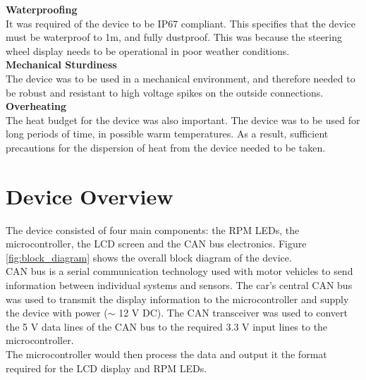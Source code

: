 \documentclass[a4paper,12pt]{article}
\begin{document}
\textbf{Waterproofing} \\

It was required of the device to be IP67 compliant. This specifies that the device must be waterproof to 1m, and fully dustproof. This was because the steering wheel display needs to be operational in poor weather conditions. \\

\textbf{Mechanical Sturdiness} \\

The device was to be used in a mechanical environment, and therefore needed to be robust and resistant to high voltage spikes on the outside connections. \\

\textbf{Overheating} \\

The heat budget for the device was also important. The device was to be used for long periods of time, in possible warm temperatures. As a result, sufficient precautions for the dispersion of heat from the device needed to be taken.


\newpage
\section{Device Overview}
\label{sec:device_overview}

The device consisted of four main components: the RPM LEDs, the microcontroller, the LCD screen and the CAN bus electronics. Figure \ref{fig:block_diagram} shows the overall block diagram of the device. \\



CAN bus is a serial communication technology used with motor vehicles to send information between individual systems and sensors. The car's central CAN bus was used to transmit the display information to the microcontroller and supply the device with power ($\sim$ 12 V DC). The CAN transceiver was used to convert the 5 V data lines of the CAN bus to the required 3.3 V input lines to the microcontroller. \\

The microcontroller would then process the data and output it the format required for the LCD display and RPM LEDs. \\
\end{document}
